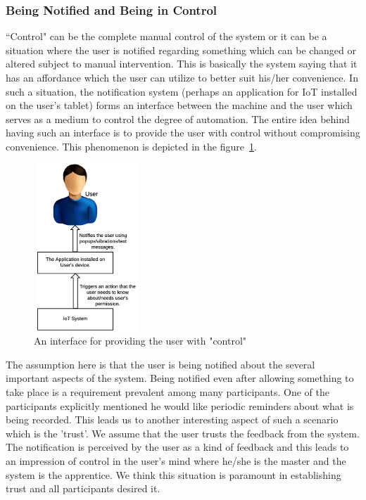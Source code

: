 \subsubsection{Being Notified and Being in Control}
``Control" can be the complete manual control of the system or it can be a situation where the user is notified regarding something which can be changed or altered subject to manual intervention. This is basically the system saying that it has an affordance which the user can utilize to better suit his/her convenience. In such a situation, the notification system (perhaps an application for IoT installed on the user's tablet) forms an interface between the machine and the user which serves as a medium to control the degree of automation. The entire idea behind having such an interface is to provide the user with control without compromising convenience. This phenomenon is depicted in the figure~\ref{fig:interface}.
\begin{figure}
	\centering
	\includegraphics[width=4cm, height=6.3cm]{figures/interface.png}
	\caption{An interface for providing the user with "control"}
	\label{fig:interface}
\end{figure}

The assumption here is that the user is being notified about the several important aspects of the system. Being notified even after allowing something to take place is a requirement prevalent among many participants. One of the participants explicitly mentioned he would like periodic reminders about what is being recorded. This leads us to another interesting aspect of such a scenario which is the 'trust'. We assume that the user trusts the feedback from the system. The notification is perceived by the user as a kind of feedback and this leads to an impression of control in the user's mind where he/she is the master and the system is the apprentice. We think this situation is paramount in establishing trust and all participants desired it.

